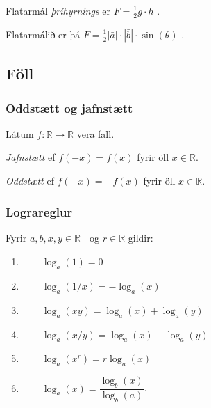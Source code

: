 \documentclass[a4paper,10pt,icelandic]{sphinxmanual}
\begin{document}
Flatarmál \textit{þríhyrnings} er \(F=\frac{1}{2}g\cdot h\) .

\begin{figure}[htbp]
\centering

\noindent{}
\end{figure}

Flatarmálið er þá \(F=\frac{1}{2}|\bar{a}| \cdot |\bar{b}| \cdot \sin(\theta)\) .

\begin{figure}[htbp]
\centering

\noindent{}
\end{figure}


\subsection{Föll}
\label{\detokenize{Kafli12:foll}}

\subsubsection{Oddstætt og jafnstætt}
\label{\detokenize{Kafli12:oddstaett-og-jafnstaett}}
Látum \(f: \mathbb{R} \to \mathbb{R}\) vera fall.

\textit{Jafnstætt} ef \(f(-x)=f(x)\) fyrir öll \(x \in \mathbb{R}\).

\textit{Oddstætt} ef \(f(-x)=-f(x)\) fyrir öll \(x \in \mathbb{R}\).


\subsubsection{Lograreglur}
\label{\detokenize{Kafli12:lograreglur}}
Fyrir \(a,b,x,y\in \mathbb{R}_+\) og \(r \in \mathbb{R}\) gildir:
\begin{enumerate}
%
\item {} 
\(\qquad \log_a(1)=0\)

\item {} 
\(\qquad \log_a(1/x)=-\log_a(x)\)

\item {} 
\(\qquad \log_a(xy)=\log_a(x)+\log_a(y)\)

\item {} 
\(\qquad \log_a(x/y)=\log_a(x)-\log_a(y)\)

\item {} 
\(\qquad \log_a(x^r)=r\log_a(x)\)

\item {} 
\(\qquad \log_a(x)=\dfrac{\log_b(x)}{\log_b(a)}\).

\end{enumerate}
\end{document}
